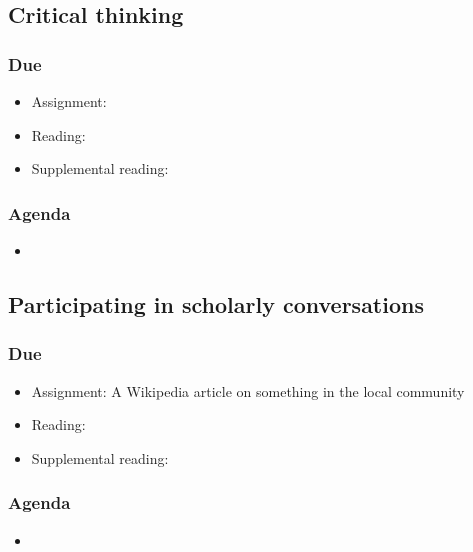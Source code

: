 \documentclass[12pt,article,oneside]{memoir}
\begin{document}
\subsection{Critical thinking}
\subsubsection{Due}
\begin{itemize}
 \item Assignment: 
 \item Reading:
 \item Supplemental reading:
\end{itemize}

\subsubsection{Agenda}
\begin{itemize}
\item 
\end{itemize}


\subsection{Participating in scholarly conversations}
\subsubsection{Due}
\begin{itemize}
 \item Assignment: A Wikipedia article on something in the local community
 \item Reading:
 \item Supplemental reading:
\end{itemize}

\subsubsection{Agenda}
\begin{itemize}
\item 
\end{itemize}



\newpage
\renewcommand{\bibname}{Reading list}
{}

\end{document}
